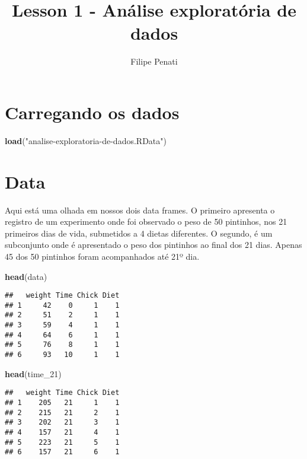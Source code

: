 \documentclass[]{article}
\title{Lesson 1 - Análise exploratória de dados}
\author{Filipe Penati}
\date{}
\newenvironment{Shaded}{\begin{snugshade}}{\end{snugshade}}
\newcommand{\KeywordTok}[1]{\textcolor[rgb]{0.13,0.29,0.53}{\textbf{#1}}}
\newcommand{\DecValTok}[1]{\textcolor[rgb]{0.00,0.00,0.81}{#1}}
\newcommand{\StringTok}[1]{\textcolor[rgb]{0.31,0.60,0.02}{#1}}
\newcommand{\NormalTok}[1]{#1}
\begin{document}
\maketitle

\section{Carregando os dados}\label{carregando-os-dados}

\begin{Shaded}
\begin{Highlighting}[]
\KeywordTok{load}\NormalTok{(}\StringTok{"analise-exploratoria-de-dados.RData"}\NormalTok{)}
\end{Highlighting}
\end{Shaded}

\section{Data}\label{data}

Aqui está uma olhada em nossos dois data frames. O primeiro apresenta o
registro de um experimento onde foi observado o peso de 50 pintinhos,
nos 21 primeiros dias de vida, submetidos a 4 dietas diferentes. O
segundo, é um subconjunto onde é apresentado o peso dos pintinhos ao
final dos 21 dias. Apenas 45 dos 50 pintinhos foram acompanhados até 21º
dia.

\begin{Shaded}
\begin{Highlighting}[]
\KeywordTok{head}\NormalTok{(data)}
\end{Highlighting}
\end{Shaded}

\begin{verbatim}
##   weight Time Chick Diet
## 1     42    0     1    1
## 2     51    2     1    1
## 3     59    4     1    1
## 4     64    6     1    1
## 5     76    8     1    1
## 6     93   10     1    1
\end{verbatim}

\begin{Shaded}
\begin{Highlighting}[]
\KeywordTok{head}\NormalTok{(time_}\DecValTok{21}\NormalTok{)}
\end{Highlighting}
\end{Shaded}

\begin{verbatim}
##   weight Time Chick Diet
## 1    205   21     1    1
## 2    215   21     2    1
## 3    202   21     3    1
## 4    157   21     4    1
## 5    223   21     5    1
## 6    157   21     6    1
\end{verbatim}
\end{document}
